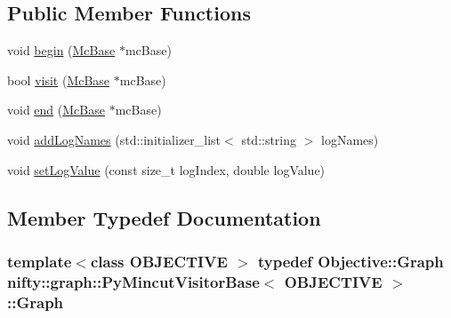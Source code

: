 \subsection*{Public Member Functions}
\begin{DoxyCompactItemize}
\item 
void \hyperlink{classnifty_1_1graph_1_1PyMincutVisitorBase_afe558af4babc2f3e934b4f105bb159ca}{begin} (\hyperlink{classnifty_1_1graph_1_1PyMincutVisitorBase_a02d791718472f3448f70bb7a551ad29d}{Mc\+Base} $\ast$mc\+Base)
\item 
bool \hyperlink{classnifty_1_1graph_1_1PyMincutVisitorBase_a173a305965e875801dc992cccd88ef61}{visit} (\hyperlink{classnifty_1_1graph_1_1PyMincutVisitorBase_a02d791718472f3448f70bb7a551ad29d}{Mc\+Base} $\ast$mc\+Base)
\item 
void \hyperlink{classnifty_1_1graph_1_1PyMincutVisitorBase_a3b8c36adbf70b9871aa2c78b9c6636df}{end} (\hyperlink{classnifty_1_1graph_1_1PyMincutVisitorBase_a02d791718472f3448f70bb7a551ad29d}{Mc\+Base} $\ast$mc\+Base)
\item 
void \hyperlink{classnifty_1_1graph_1_1PyMincutVisitorBase_ac55097eba5d5871a506d50ab892d1ea5}{add\+Log\+Names} (std\+::initializer\+\_\+list$<$ std\+::string $>$ log\+Names)
\item 
void \hyperlink{classnifty_1_1graph_1_1PyMincutVisitorBase_aa3d0831f15b710dc3e9dfac71b2eef6f}{set\+Log\+Value} (const size\+\_\+t log\+Index, double log\+Value)
\end{DoxyCompactItemize}


\subsection{Member Typedef Documentation}
\hypertarget{classnifty_1_1graph_1_1PyMincutVisitorBase_ad99444f656759acea3ff9899d074b704}{}
\subsubsection[{Graph}]{\setlength{\rightskip}{0pt plus 5cm}template$<$class O\+B\+J\+E\+C\+T\+I\+V\+E $>$ typedef Objective\+::\+Graph {\bf nifty\+::graph\+::\+Py\+Mincut\+Visitor\+Base}$<$ O\+B\+J\+E\+C\+T\+I\+V\+E $>$\+::{\bf Graph}}\label{classnifty_1_1graph_1_1PyMincutVisitorBase_ad99444f656759acea3ff9899d074b704}
\hypertarget{classnifty_1_1graph_1_1PyMincutVisitorBase_a02d791718472f3448f70bb7a551ad29d}{}
